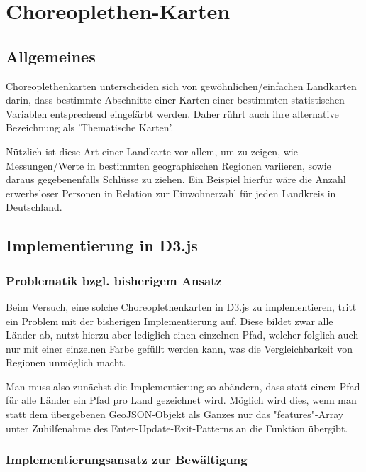 \chapter{Choreoplethen-Karten}
\label{choreopleth}

\section{Allgemeines}
\label{sec:choreopleth-abstract}

Choreoplethenkarten unterscheiden sich von gewöhnlichen/einfachen Landkarten darin, dass bestimmte Abschnitte einer Karten einer bestimmten statistischen Variablen entsprechend eingefärbt werden. Daher rührt auch ihre alternative Bezeichnung als 'Thematische Karten'.

Nützlich ist diese Art einer Landkarte vor allem, um zu zeigen, wie Messungen/Werte in bestimmten geographischen Regionen variieren, sowie daraus gegebenenfalls Schlüsse zu ziehen. Ein Beispiel hierfür wäre die Anzahl erwerbsloser Personen in Relation zur Einwohnerzahl für jeden Landkreis in Deutschland.

\section{Implementierung in D3.js}
\label{sec:choreopleth-implementation}

\subsection{Problematik bzgl. bisherigem Ansatz}

Beim Versuch, eine solche Choreoplethenkarten in D3.js zu implementieren, tritt ein Problem mit der bisherigen Implementierung auf. Diese bildet zwar alle Länder ab, nutzt hierzu aber lediglich einen einzelnen Pfad, welcher folglich auch nur mit einer einzelnen Farbe gefüllt werden kann, was die Vergleichbarkeit von Regionen unmöglich macht.

Man muss also zunächst die Implementierung so abändern, dass statt einem Pfad für alle Länder ein Pfad pro Land gezeichnet wird. Möglich wird dies, wenn man statt dem übergebenen GeoJSON-Objekt als Ganzes nur das "features"-Array unter Zuhilfenahme des Enter-Update-Exit-Patterns an die Funktion übergibt.

\subsection{Implementierungsansatz zur Bewältigung}

